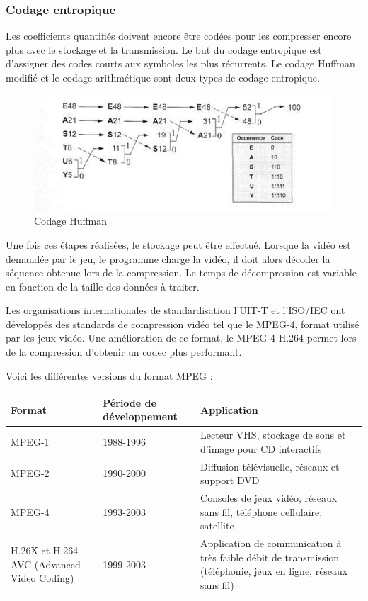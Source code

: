 \documentclass[a4paper, 11pt]{article} %
\begin{document}
\subsubsection{Codage entropique}
Les coefficients quantifiés doivent encore être codées pour les compresser encore plus avec le stockage et la transmission. Le but du codage entropique est d'assigner des codes courts aux symboles les plus récurrents. Le codage Huffman modifié et le codage arithmétique sont deux types de codage entropique.

\begin{figure}[!h]%
\includegraphics[width=\textwidth]{images/codage_huffman.jpg}%
\caption{Codage Huffman}%
\label{}%
\end{figure}

\newpage

Une fois ces étapes réalisées, le stockage peut être effectué. Lorsque la vidéo est demandée par le jeu, le programme charge la vidéo, il doit alors décoder la séquence obtenue lors de la compression. Le temps de décompression est variable en fonction de la taille des données à traiter. 

Les organisations internationales de standardisation l'UIT-T et l'ISO/IEC ont développés des standards de compression vidéo tel que le MPEG-4, format utilisé par les jeux vidéo. Une amélioration de ce format, le MPEG-4 H.264 permet lors de la compression d'obtenir un codec plus performant.

Voici les différentes versions du format MPEG :

\begin{center}
	\begin{tabular}{|p{}|p{}|p{}|}
		\hline
		Format & Période de développement & Application\\
		\hline
		MPEG-1&1988-1996&Lecteur VHS, stockage de sons et d'image pour CD interactifs\\
		MPEG-2&1990-2000&Diffusion télévisuelle, réseaux et support DVD\\
		MPEG-4&1993-2003&Consoles de jeux vidéo, réseaux sans fil, téléphone cellulaire, satellite\\
		H.26X et H.264 AVC (Advanced Video Coding)&1999-2003&Application de communication à très faible débit de transmission (téléphonie, jeux en ligne, réseaux sans fil)\\
		\hline
	\end{tabular}
\end{center}
\end{document}
